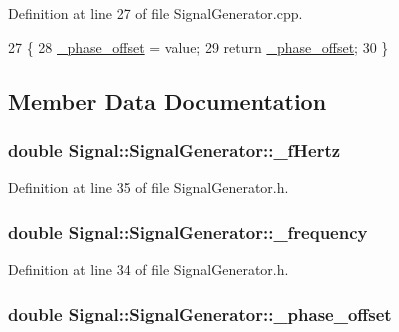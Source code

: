 Definition at line 27 of file Signal\+Generator.\+cpp.


\begin{DoxyCode}
27                                                                    \{
28     \hyperlink{classSignal_1_1SignalGenerator_a6b4444d46747c8517171edbbf4b5588f}{\_phase\_offset} = value;
29     \textcolor{keywordflow}{return} \hyperlink{classSignal_1_1SignalGenerator_a6b4444d46747c8517171edbbf4b5588f}{\_phase\_offset};
30 \}
\end{DoxyCode}


\subsection{Member Data Documentation}
\hypertarget{classSignal_1_1SignalGenerator_a85a4702347352bab1c71e0a8df8437d6}{
\subsubsection[{\+\_\+f\+Hertz}]{\setlength{\rightskip}{0pt plus 5cm}double Signal\+::\+Signal\+Generator\+::\+\_\+f\+Hertz\hspace{0.3cm}{\ttfamily [protected]}}}\label{classSignal_1_1SignalGenerator_a85a4702347352bab1c71e0a8df8437d6}


Definition at line 35 of file Signal\+Generator.\+h.

\hypertarget{classSignal_1_1SignalGenerator_a7f107461333bce68c5dad412db96a8c2}{
\subsubsection[{\+\_\+frequency}]{\setlength{\rightskip}{0pt plus 5cm}double Signal\+::\+Signal\+Generator\+::\+\_\+frequency\hspace{0.3cm}{\ttfamily [protected]}}}\label{classSignal_1_1SignalGenerator_a7f107461333bce68c5dad412db96a8c2}


Definition at line 34 of file Signal\+Generator.\+h.

\hypertarget{classSignal_1_1SignalGenerator_a6b4444d46747c8517171edbbf4b5588f}{
\subsubsection[{\+\_\+phase\+\_\+offset}]{\setlength{\rightskip}{0pt plus 5cm}double Signal\+::\+Signal\+Generator\+::\+\_\+phase\+\_\+offset\hspace{0.3cm}{\ttfamily [protected]}}}\label{classSignal_1_1SignalGenerator_a6b4444d46747c8517171edbbf4b5588f}


